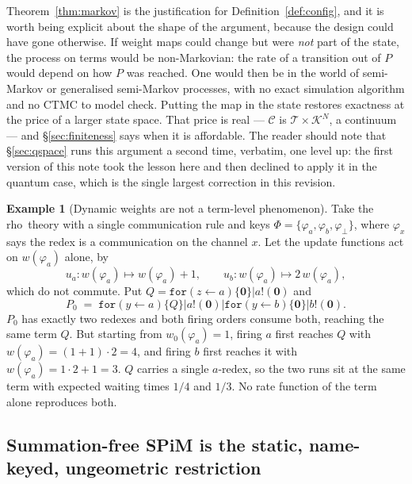 \documentclass[11pt,a4paper]{article}
\theoremstyle{plain}
\theoremstyle{definition}
\newtheorem{example}[theorem]{Example}
\theoremstyle{remark}
\newcommand{\rhoc}{\textsf{rho}}
\newcommand{\Nil}{\mathbf{0}}
\newcommand{\sepc}{\mathbin{\big|}}
\newcommand{\Terms}{\mathcal{T}}
\newcommand{\Cfg}{\mathcal{C}}
\newcommand{\wmap}{w}
\begin{document}
Theorem~\ref{thm:markov} is the justification for Definition~\ref{def:config}, and it is worth being
explicit about the shape of the argument, because the design could have gone otherwise. If weight
maps could change but were \emph{not} part of the state, the process on terms would be
non-Markovian: the rate of a transition out of $P$ would depend on how $P$ was reached. One would
then be in the world of semi-Markov or generalised semi-Markov processes, with no exact simulation
algorithm and no CTMC to model check. Putting the map in the state restores exactness at the price
of a larger state space. That price is real --- $\Cfg$ is $\Terms \times \mathcal{K}^N$, a
continuum --- and \S\ref{sec:finiteness} says when it is affordable. The reader should note that
\S\ref{sec:qspace} runs this argument a second time, verbatim, one level up: the first version of
this note took the lesson here and then declined to apply it in the quantum case, which is the single
largest correction in this revision.

\begin{example}[Dynamic weights are not a term-level phenomenon]
\label{ex:nonmarkov}
Take the \rhoc\ theory with a single communication rule and keys
$\Phi = \{\varphi_a, \varphi_b, \varphi_\bot\}$, where $\varphi_x$ says the redex is a communication
on the channel $x$. Let the update functions act on $\wmap(\varphi_a)$ alone, by
\[
u_a : \wmap(\varphi_a) \mapsto \wmap(\varphi_a) + 1,
\qquad
u_b : \wmap(\varphi_a) \mapsto 2\,\wmap(\varphi_a),
\]
which do not commute. Put $Q = \texttt{for}(z \leftarrow a)\{\Nil\} \sepc a!(\Nil)$ and
\[
P_0 \;=\; \texttt{for}(y \leftarrow a)\{Q\} \sepc a!(\Nil) \sepc \texttt{for}(y\leftarrow b)\{\Nil\} \sepc b!(\Nil).
\]
$P_0$ has exactly two redexes and both firing orders consume both, reaching the same term $Q$. But
starting from $\wmap_0(\varphi_a) = 1$, firing $a$ first reaches $Q$ with
$\wmap(\varphi_a) = (1+1)\cdot 2 = 4$, and firing $b$ first reaches it with
$\wmap(\varphi_a) = 1\cdot 2 + 1 = 3$. $Q$ carries a single $a$-redex, so the two runs sit at the
same term with expected waiting times $1/4$ and $1/3$. No rate function of the term alone reproduces
both.
\end{example}

\subsection{Summation-free SPiM is the static, name-keyed, ungeometric restriction}
\label{sec:spim}
\end{document}
